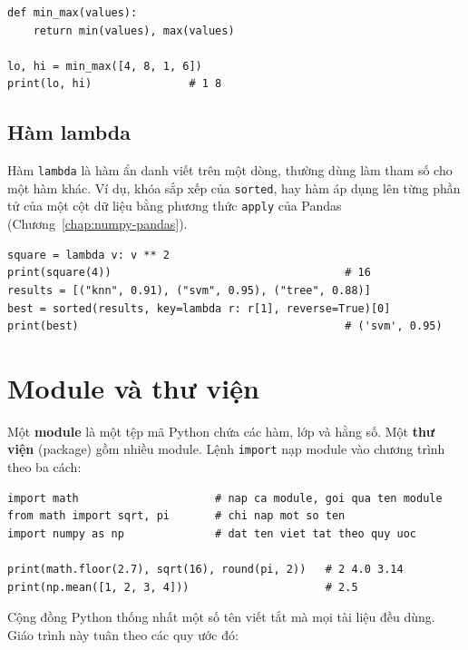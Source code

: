 \begin{lstlisting}[caption={Hàm trả về nhiều giá trị}]
def min_max(values):
    return min(values), max(values)

lo, hi = min_max([4, 8, 1, 6])
print(lo, hi)               # 1 8
\end{lstlisting}

\subsection{Hàm lambda}
Hàm \texttt{lambda} là hàm ẩn danh viết trên một dòng, thường dùng làm tham số cho một hàm khác. Ví dụ, khóa sắp xếp của \texttt{sorted}, hay hàm áp dụng lên từng phần tử của một cột dữ liệu bằng phương thức \texttt{apply} của Pandas (Chương~\ref{chap:numpy-pandas}).

\begin{lstlisting}[caption={Hàm lambda làm khóa sắp xếp}]
square = lambda v: v ** 2
print(square(4))                                    # 16
results = [("knn", 0.91), ("svm", 0.95), ("tree", 0.88)]
best = sorted(results, key=lambda r: r[1], reverse=True)[0]
print(best)                                         # ('svm', 0.95)
\end{lstlisting}

\section{Module và thư viện}
\label{sec:python-import}

Một \textbf{module} là một tệp mã Python chứa các hàm, lớp và hằng số. Một \textbf{thư viện} (package) gồm nhiều module. Lệnh \texttt{import} nạp module vào chương trình theo ba cách:

\begin{lstlisting}[caption={Ba cách import}]
import math                     # nap ca module, goi qua ten module
from math import sqrt, pi       # chi nap mot so ten
import numpy as np              # dat ten viet tat theo quy uoc

print(math.floor(2.7), sqrt(16), round(pi, 2))   # 2 4.0 3.14
print(np.mean([1, 2, 3, 4]))                     # 2.5
\end{lstlisting}

Cộng đồng Python thống nhất một số tên viết tắt mà mọi tài liệu đều dùng. Giáo trình này tuân theo các quy ước đó:

